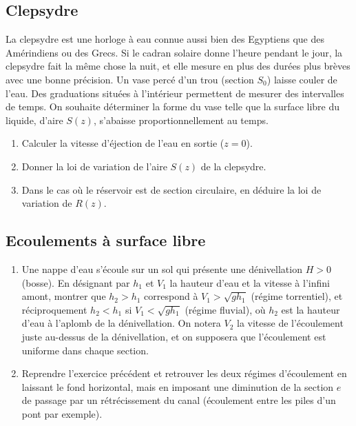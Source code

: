 {%
\subsection{Clepsydre}

La clepsydre est une horloge \`a eau connue aussi bien des Egyptiens que des
Am\'erindiens ou des Grecs.
Si le cadran solaire donne l'heure pendant le jour, 
la clepsydre fait la m\^eme chose la nuit, et elle mesure en plus
des dur\'ees plus br\`eves avec une bonne pr\'ecision. 
Un vase perc\'e d'un trou (section $S_0$) laisse couler de l'eau.
Des graduations situ\'ees \`a l'int\'erieur permettent de mesurer des
intervalles de temps.
On souhaite d\'eterminer la forme du vase
telle que la surface libre du liquide, d'aire $S(z)$, s'abaisse 
proportionnellement au temps.
\begin{enumerate}
\item
Calculer la vitesse d'\'ejection de l'eau en sortie ($z=0$).
\item
Donner la loi de variation de l'aire $S(z)$ de la clepsydre.
\item
Dans le cas o\`u le r\'eservoir est de section circulaire,
en d\'eduire la loi de variation de $R(z)$.
\end{enumerate}




\subsection{Ecoulements \`a surface libre}

\begin{enumerate}
\item
Une nappe d'eau s'\'ecoule sur un sol qui pr\'esente une d\'enivellation $H>0$
(bosse).
En d\'esignant par $h_1$ et $V_1$ la hauteur d'eau et la vitesse \`a l'infini
amont, montrer que $h_2 > h_1$ correspond \`a $V_1>\sqrt{gh_1}$
(r\'egime torrentiel), et r\'eciproquement
$h_2 < h_1$ si $V_1<\sqrt{gh_1}$ (r\'egime fluvial),
o\`u $h_2$ est la hauteur d'eau \`a l'aplomb de la d\'enivellation.
On notera $V_2$ la vitesse de l'\'ecoulement juste au-dessus de la
d\'enivellation, et on supposera que l'\'ecoulement est uniforme dans chaque
section.
\item
Reprendre l'exercice pr\'ec\'edent et retrouver les deux r\'egimes
d'\'ecoulement en laissant le fond horizontal, mais en imposant une diminution
de la section $e$ de passage par un r\'etr\'ecissement du canal
(\'ecoulement entre les piles d'un pont par exemple).
\end{enumerate}

}
